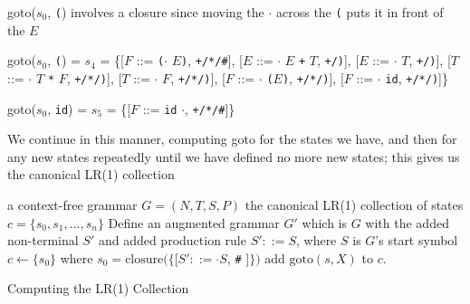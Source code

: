 \documentclass[8pt,a4paper,compress,handout]{beamer}
\newcommand{\mm}[1]{$#1$}
\newcommand{\subs}[2]{${#1}_{#2}$}
\newenvironment{spaced}
{
\smallskip
\hspace{.5cm}
\begin{minipage}[c]{\textwidth}
}
{
\end{minipage}
\smallskip
}
\begin{document}
\begin{frame}[fragile]
\pause

\text{ }
\begin{spaced}
\begin{production}
goto(\subs{s}{0}, \lstinline{(}) involves a closure since moving the \mm{\cdot} across the \lstinline{(} puts it in front of the \mm{E}

goto(\subs{s}{0}, \lstinline{(}) = \subs{s}{4}
               = \{[\mm{F}  ::= \lstinline{(}\mm{\cdot} \mm{E}\lstinline{)},  \lstinline{+/*/#}],
                    [\mm{E}  ::= \mm{\cdot} \mm{E} \lstinline{+} \mm{T}, \lstinline{+/)}],
                    [\mm{E}  ::= \mm{\cdot} \mm{T}, \lstinline{+/)}],
                    [\mm{T}  ::= \mm{\cdot} \mm{T} \lstinline{*} \mm{F}, \lstinline{+/*/)}],
                    [\mm{T}  ::= \mm{\cdot} \mm{F}, \lstinline{+/*/)}],
                    [\mm{F}  ::= \mm{\cdot} \lstinline{(}\mm{E}\lstinline{)}, \lstinline{+/*/)}],
                    [\mm{F}  ::= \mm{\cdot} \lstinline{id}, \lstinline{+/*/)}]\}

goto(\subs{s}{0}, \lstinline{id}) = \subs{s}{5}
                = \{[\mm{F}  ::= \lstinline{id} \mm{\cdot}, \lstinline{+/*/#}]\}
\end{production}
\end{spaced}

\pause

We continue in this manner, computing goto for the states we have, and then for any new states repeatedly until we have defined no more new states; this gives us the canonical LR(1) collection
\end{frame}

\begin{frame}[fragile]
\pause

\begin{algorithm}[H]
\begin{algorithmic}
\REQUIRE a context-free grammar $G = (N,T,S,P)$
\ENSURE the canonical LR(1) collection of states $c = \{s_0, s_1, \dots, s_n\}$
\STATE Define an augmented grammar $G'$ which is $G$ with the added non-terminal $S'$ and added production rule $S' ::= S$, where $S$ is $G$'s start symbol
\STATE $c \gets \{s_0\}$ where $s_0 = \text{closure}(\{[S' ::= \cdot S$, \lstinline{#} $]\})$
\REPEAT
{}
\STATE add $\text{goto}(s, X)$ to $c$.
\ENDIF
\ENDFOR
{}
\end{algorithmic}
\caption{Computing the LR(1) Collection}
\end{algorithm}
\end{frame}
\end{document}
